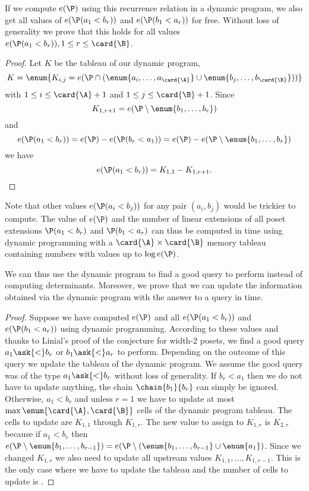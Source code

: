 If we compute \(e(\P)\) using this recurrence relation in a dynamic program,
we also get all values of \(e(\P(a_1 < b_r))\) and \(e(\P(b_1 < a_r))\) for
free. Without loss of generality we prove that this holds for all
values \(e(\P(a_1 < b_r)), 1 \le r \le \card{\B}\).
\begin{proof}
Let \(K\) be the tableau of our dynamic program, \ie
\begin{displaymath}
K = \enum{K_{i,j} = e(\P \cap (\enum{a_i,\ldots,a_{\card{\A}}} \cup
\enum{b_j,\ldots,b_{\card{\B}}}))}
\end{displaymath}
with \(1 \le i \le \card{\A}+1\) and \(1 \le j \le \card{\B}+1\). Since
\begin{displaymath}
K_{1,r+1} = e(\P \setminus \enum{b_1,\ldots,b_r})
\end{displaymath}
and
\begin{displaymath}
e(\P(a_1 < b_r)) = e(\P) - e(\P(b_r < a_1)) = e(\P) - e(\P \setminus \enum{b_1,\ldots,b_r})
\end{displaymath}
we have
\begin{displaymath}
e(\P(a_1 < b_r)) = K_{1,1} - K_{1,r+1}.\qedhere
\end{displaymath}
\end{proof}
Note that other values \(e(\P(a_i < b_j))\) for any pair \((a_i,b_j)\)
would be trickier to compute. The value of \(e(\P)\) and the number of linear
extensions of all poset extensions \(\P(a_1 < b_r)\) and \(\P(b_1 < a_r)\) can
thus be computed in  time using dynamic programming with a
\(\card{\A} \times \card{\B}\) memory tableau containing numbers with values up to \(\log
e(\P)\).

We can thus use the dynamic program to find a good query to perform instead of
computing determinants.
Moreover, we prove that we can update the information obtained via the dynamic program
with the answer to a query in  time.
\begin{proof}
Suppose we have computed \(e(\P)\) and all \(e(\P(a_1 < b_r))\) and
\(e(\P(b_1 < a_r))\) using dynamic programming. According to these values and
thanks to Linial's proof of the \onethirdtwothird conjecture for width-\(2\)
posets, we find a good query \(a_1 \ask{<} b_r\) or \(b_1 \ask{<} a_r\) to perform.
Depending on the outcome of this query we update the tableau of the dynamic
program. We assume the good query was of the type \(a_1 \ask{<} b_r\)
without loss of generality. If \(b_r < a_1\) then we do not have to update anything,
the chain \(\chain{b_1}{b_r}\) can simply be ignored. Otherwise, \(a_1 <
b_r\) and
unless \(r = 1\) we have to update at most \(\max\enum{\card{\A}, \card{\B}}\) cells of the dynamic program
tableau. The
cells to update are \(K_{1,1}\) through \(K_{1,r}\). The
new value to assign to \(K_{1,r}\) is \(K_{2,r}\) because if \(a_1 < b_r\)
then \(e(\P \setminus
\enum{b_1,\ldots,b_{r-1}}) = e(\P \setminus (\enum{b_1,\ldots,b_{r-1}} \cup
\enum{a_1})\). Since we changed \(K_{1,r}\) we also need to update all upstream
values \(K_{1,1}, \ldots, K_{1,r-1}\). This is the only case where we have to
update the tableau and the number of cells to update is .
\end{proof}

